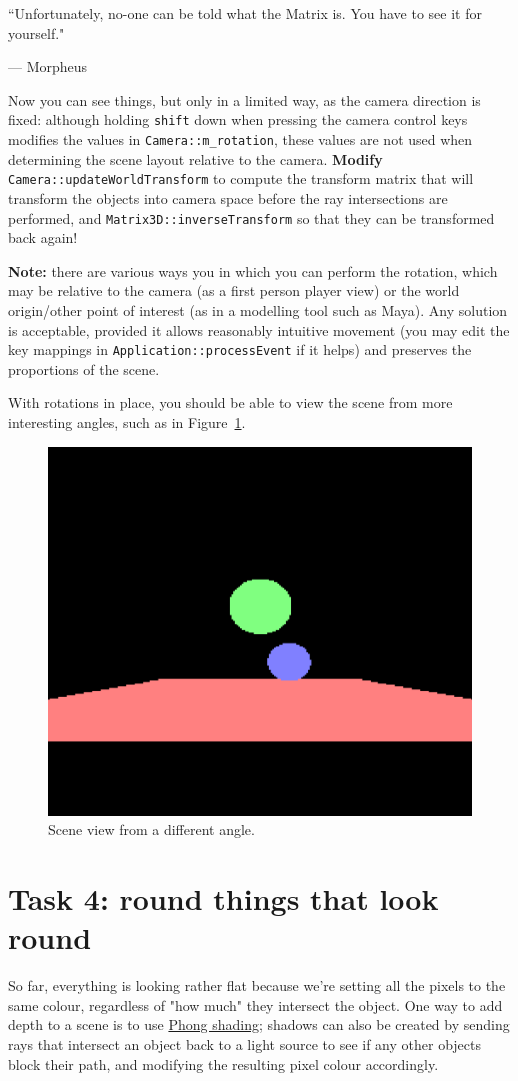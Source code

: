 \documentclass{../../../fal_assignment}
\begin{document}
\begin{marginquote}
``Unfortunately, no-one can be told what the Matrix is. You have to see it for yourself."

\par --- Morpheus
\end{marginquote}

Now you can see things, but only in a limited way, as the camera direction is fixed: although holding \texttt{shift} down when pressing the camera control keys modifies the values in \lstinline{Camera::m_rotation}, these values are not used when determining the scene layout relative to the camera. \textbf{Modify} \lstinline{Camera::updateWorldTransform} to compute the transform matrix that will transform the objects into camera space before the ray intersections are performed, and \lstinline{Matrix3D::inverseTransform} so that they can be transformed back again!

\textbf{Note:} there are various ways you in which you can perform the rotation, which may be relative to the camera (as a first person player view) or the world origin/other point of interest (as in a modelling tool such as Maya). Any solution is acceptable, provided it allows reasonably intuitive movement (you may edit the key mappings in \lstinline{Application::processEvent} if it helps) and preserves the proportions of the scene.

With rotations in place, you should be able to view the scene from more interesting angles, such as in  Figure~\ref{fig:rotate}.

\begin{figure}[ht]
	\begin{center}
		\includegraphics[width=0.25\linewidth]{rotate}
	\end{center}
	\caption{Scene view from a different angle.}
	\label{fig:rotate}
\end{figure}

\section*{Task 4: round things that look round}

So far, everything is looking rather flat because we're setting all the pixels to the same colour, regardless of "how much" they intersect the object. One way to add depth to a scene is to use \href{https://users.cs.northwestern.edu/~ago820/cs395/Papers/Phong_1975.pdf}{Phong shading}; shadows can also be created by sending rays that intersect an object back to a light source to see if any other objects block their path, and modifying the resulting pixel colour accordingly.
\end{document}
